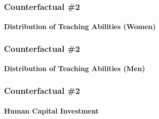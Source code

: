 \documentclass[11pt]{beamer}
\begin{document}
\begin{frame}
\frametitle{Counterfactual \#2}
\framesubtitle{Distribution of Teaching Abilities (Women)}
\begin{figure}
\begin{center}
\label{ }
\end{center}
\end{figure}
\end{frame}

\begin{frame}
\frametitle{Counterfactual \#2}
\framesubtitle{Distribution of Teaching Abilities (Men)}
\begin{figure}
\begin{center}
\label{ }
\end{center}
\end{figure}
\end{frame}

\begin{frame}
\frametitle{Counterfactual \#2}
\framesubtitle{Human Capital Investment}
\begin{figure}
\begin{center}
\label{ }
\end{center}
\end{figure}
\end{frame}
\end{document}

